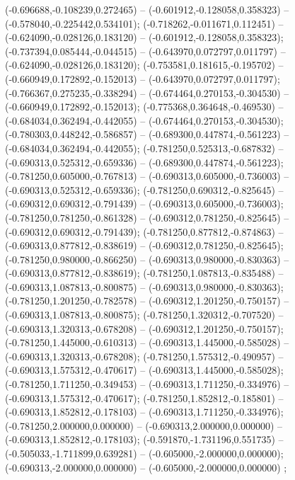  (-0.696688,-0.108239,0.272465) -- (-0.601912,-0.128058,0.358323) -- (-0.578040,-0.225442,0.534101);
 (-0.718262,-0.011671,0.112451) -- (-0.624090,-0.028126,0.183120) -- (-0.601912,-0.128058,0.358323);
 (-0.737394,0.085444,-0.044515) -- (-0.643970,0.072797,0.011797) -- (-0.624090,-0.028126,0.183120);
 (-0.753581,0.181615,-0.195702) -- (-0.660949,0.172892,-0.152013) -- (-0.643970,0.072797,0.011797);
 (-0.766367,0.275235,-0.338294) -- (-0.674464,0.270153,-0.304530) -- (-0.660949,0.172892,-0.152013);
 (-0.775368,0.364648,-0.469530) -- (-0.684034,0.362494,-0.442055) -- (-0.674464,0.270153,-0.304530);
 (-0.780303,0.448242,-0.586857) -- (-0.689300,0.447874,-0.561223) -- (-0.684034,0.362494,-0.442055);
 (-0.781250,0.525313,-0.687832) -- (-0.690313,0.525312,-0.659336) -- (-0.689300,0.447874,-0.561223);
 (-0.781250,0.605000,-0.767813) -- (-0.690313,0.605000,-0.736003) -- (-0.690313,0.525312,-0.659336);
 (-0.781250,0.690312,-0.825645) -- (-0.690312,0.690312,-0.791439) -- (-0.690313,0.605000,-0.736003);
 (-0.781250,0.781250,-0.861328) -- (-0.690312,0.781250,-0.825645) -- (-0.690312,0.690312,-0.791439);
 (-0.781250,0.877812,-0.874863) -- (-0.690313,0.877812,-0.838619) -- (-0.690312,0.781250,-0.825645);
 (-0.781250,0.980000,-0.866250) -- (-0.690313,0.980000,-0.830363) -- (-0.690313,0.877812,-0.838619);
 (-0.781250,1.087813,-0.835488) -- (-0.690313,1.087813,-0.800875) -- (-0.690313,0.980000,-0.830363);
 (-0.781250,1.201250,-0.782578) -- (-0.690312,1.201250,-0.750157) -- (-0.690313,1.087813,-0.800875);
 (-0.781250,1.320312,-0.707520) -- (-0.690313,1.320313,-0.678208) -- (-0.690312,1.201250,-0.750157);
 (-0.781250,1.445000,-0.610313) -- (-0.690313,1.445000,-0.585028) -- (-0.690313,1.320313,-0.678208);
 (-0.781250,1.575312,-0.490957) -- (-0.690313,1.575312,-0.470617) -- (-0.690313,1.445000,-0.585028);
 (-0.781250,1.711250,-0.349453) -- (-0.690313,1.711250,-0.334976) -- (-0.690313,1.575312,-0.470617);
 (-0.781250,1.852812,-0.185801) -- (-0.690313,1.852812,-0.178103) -- (-0.690313,1.711250,-0.334976);
 (-0.781250,2.000000,0.000000) -- (-0.690313,2.000000,0.000000) -- (-0.690313,1.852812,-0.178103);
 (-0.591870,-1.731196,0.551735) -- (-0.505033,-1.711899,0.639281) -- (-0.605000,-2.000000,0.000000);
 (-0.690313,-2.000000,0.000000) -- (-0.605000,-2.000000,0.000000) ;
